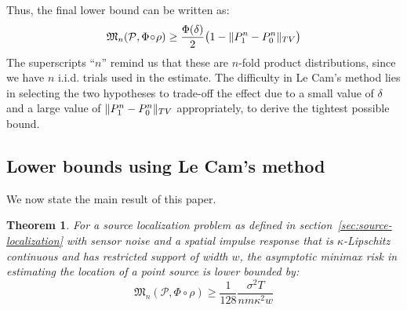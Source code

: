 \documentclass[conference]{IEEEtran}
\DeclarePairedDelimiter\norm{\lVert}{\rVert}
\newcommand{\Phiorho}{\Phi\!\circ\!\rho}
\newtheorem{theorem}{Theorem}
\begin{document}
Thus, the final lower bound can be written as:
\begin{equation} \label{eq:le-cam-bound}
	\mathfrak{M}_n(\mathcal P, \Phiorho) \geq \frac{\Phi(\delta)}{2} \big(1 - \norm{P_1^n - P_0^n}_{TV}\big)
\end{equation}
The superscripts ``$n$'' remind us that these are $n$-fold product
distributions, since we have $n$ i.i.d. trials used in the estimate.  The
difficulty in Le Cam's method lies in selecting the two hypotheses to trade-off
the effect due to a small value of $\delta$ and a large value of $\norm{P_1^n -
P_0^n}_{TV}$ appropriately, to derive the tightest possible bound.

\subsection{Lower bounds using Le Cam's method}

We now state the main result of this paper.
\begin{theorem}
	For a source localization problem as defined in
	section~\ref{sec:source-localization} with sensor noise and a spatial
	impulse response that is $\kappa$-Lipschitz continuous and has restricted
	support of width $w$, the asymptotic minimax risk in estimating the
	location of a point source is lower bounded by:
	\begin{equation}
		\mathfrak{M}_n(\mathcal{P}, \Phiorho) \geq \frac{1}{128} \frac{\sigma^2 T}{nm\kappa^2w}
	\end{equation}
\end{theorem}
\end{document}
